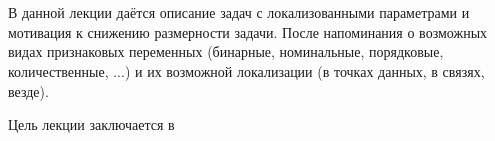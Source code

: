 \chapter{\docname}

В данной лекции даётся описание задач с локализованными параметрами и мотивация к снижению размерности задачи. После напоминания о возможных видах признаковых переменных (бинарные, номинальные, порядковые, количественные, ...) и их возможной локализации (в точках данных, в связях, везде).

Цель лекции заключается в 
